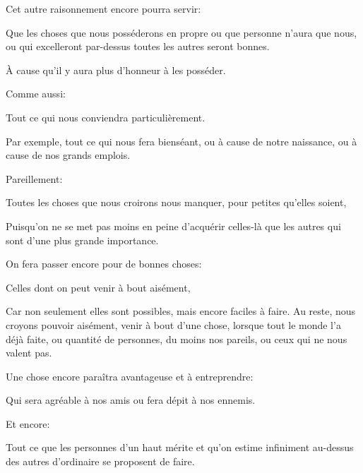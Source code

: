 \bigbreak

Cet autre raisonnement encore pourra servir:

\begin{emphpar}
	  Que les choses que nous posséderons en propre ou que personne n'aura que nous, ou qui excelleront par-dessus toutes les autres
	  seront bonnes.
\end{emphpar}

À cause qu'il y aura plus d'honneur à les posséder.

\bigbreak

Comme aussi:

\begin{emphpar}
	  Tout ce qui nous conviendra particulièrement.
\end{emphpar}

Par exemple, tout ce qui nous fera bienséant, ou à cause de notre naissance, ou à cause de nos grands emplois.

\bigbreak

Pareillement:

\begin{emphpar}
	  Toutes les choses que nous croirons nous manquer, pour petites qu'elles soient,
\end{emphpar}

Puisqu'on ne se met pas moins en peine d'acquérir celles-là que les autres qui sont d'une plus grande importance.

\bigbreak

On fera passer encore pour de bonnes choses:

\begin{emphpar}
	  Celles dont on peut venir à bout aisément,
\end{emphpar}

Car non seulement elles sont possibles, mais encore faciles à faire. Au reste, nous croyons pouvoir aisément, venir à
bout d'une chose, lorsque tout le monde l'a déjà faite, ou quantité de personnes, du moins nos pareils, ou ceux qui ne
nous valent pas.

\bigbreak

Une chose encore paraîtra avantageuse et à entreprendre:

\begin{emphpar}
	  Qui sera agréable à nos amis ou fera dépit à nos ennemis.
\end{emphpar}

\bigbreak

Et encore: 

\begin{emphpar}
	 Tout ce que les personnes d'un haut mérite et qu'on estime infiniment au-dessus des autres d’ordinaire se
	 proposent de faire.
\end{emphpar}

